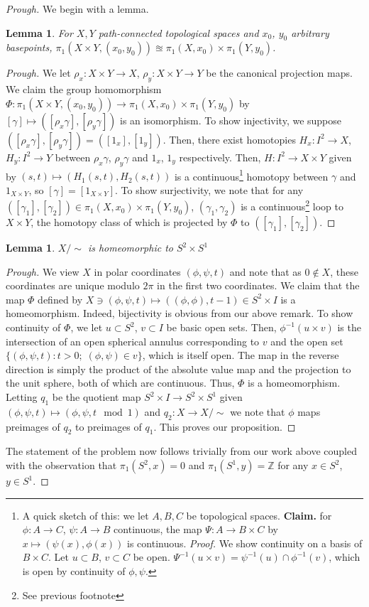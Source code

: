 \documentclass[english]{article}
\newcommand{\ZZ}{\mathbb{Z}}
\newenvironment{subproof}[1][\proofname]{%
	\renewcommand{\qedsymbol}{$\blacksquare$}%
	\begin{proof}[#1]%
	}{%
	\end{proof}%
}
\newtheorem{lemma}[theorem]{Lemma}
\theoremstyle{remark}
\theoremstyle{definition}
\begin{document}
 \begin{proof}[Prough]
 	We begin with a lemma.
 	\begin{lemma}
 		\label{prod} For $X, Y$ path-connected topological spaces and $x_0$, $y_0$ arbitrary basepoints, $\pi_1(X\times Y,(x_0,y_0))\approxeq \pi_1(X,x_0)\times \pi_1(Y,y_0)$. 
 	\end{lemma}
 \begin{subproof}[Prough]
 	We let $\rho_x:X\times Y\to X$, $\rho_y:X\times Y\to Y$ be the canonical projection maps. We claim the group homomorphism $\Phi:\pi_1(X\times Y,(x_0,y_0))\to\pi_1(X,x_0)\times \pi_1(Y,y_0)$ by $[\gamma]\mapsto ([\rho_x\gamma],[\rho_y\gamma])$ is an isomorphism. To show injectivity, we suppose $([\rho_x\gamma],[\rho_y\gamma])=([1_x],[1_y])$. Then, there exist homotopies $H_x:I^2\to X$, $H_y:I^2\to Y$ between $\rho_x\gamma$, $\rho_y\gamma$ and $1_x$, $1_y$ respectively. Then, $H:I^2\to X\times Y$ given by $(s,t)\mapsto (H_1(s,t),H_2(s,t))$ is a continuous\footnote{A quick sketch of this: we let $A,B,C$ be topological spaces. \textbf{Claim.} for $\phi:A\to C$, $\psi:A\to B$ continuous, the map $\Psi:A\to B\times C$ by $x\mapsto (\psi(x),\phi(x))$ is continuous. \emph{Proof.} We show continuity on a basis of $B\times C$. Let $u\subset B$, $v\subset C$ be open. $\Psi^{-1}(u\times v)=\psi^{-1}(u)\cap \phi^{-1}(v)$, which is open by continuity of $\phi,\psi$.} homotopy between $\gamma$ and $1_{X\times Y}$, so $[\gamma]=[1_{X\times Y}]$. To show surjectivity, we note that for any $([\gamma_1],[\gamma_2])\in \pi_1(X,x_0)\times\pi_1(Y,y_0)$, $(\gamma_1,\gamma_2)$ is a continuous\footnote{See previous footnote} loop to $X\times Y$, the homotopy class of which is projected by $\Phi$ to $([\gamma_1],[\gamma_2])$. 
 \end{subproof}
\begin{lemma}
	$X/\sim$ is homeomorphic to $S^2\times S^1$
\end{lemma}
\begin{subproof}[Prough]
We view $X$ in polar coordinates $(\phi,\psi,t)$ and note that as $0\not \in X$, these coordinates are unique modulo $2\pi$ in the first two coordinates. We claim that the map $\Phi$ defined by $X\ni(\phi,\psi,t) \mapsto((\phi,\phi),t-1)\in S^2\times I$ is a homeomorphism. Indeed, bijectivity is obvious from our above remark. To show continuity of $\Phi$, we let $u\subset S^2$, $v\subset I$ be basic open sets. Then, $\phi^{-1}(u\times v)$ is the intersection of an open spherical annulus corresponding to $v$ and the open set $\{(\phi,\psi,t):t>0;\;(\phi,\psi)\in v\}$, which is itself open. The map in the reverse direction is simply the product of the absolute value map and the projection to the unit sphere, both of which are continuous. Thus, $\Phi$ is a homeomorphism. Letting $q_1$ be the quotient map $S^2\times I\to S^2 \times S^1$ given $(\phi,\psi,t)\mapsto (\phi,\psi,t\mod 1)$ and $q_2:X\to X/\sim$ we note that $\phi$ maps preimages of $q_2$ to preimages of $q_1$. This proves our proposition.
\end{subproof}
The statement of the problem now follows trivially from our work above coupled with the observation that $\pi_1(S^2,x)=0$ and $\pi_1(S^1,y)=\ZZ$ for any $x\in S^2$, $y\in S^1$.
 \end{proof}
\end{document}
